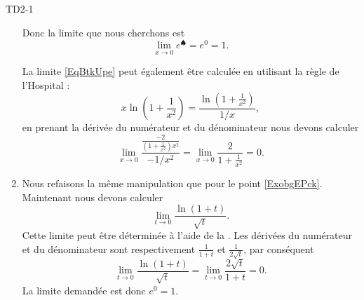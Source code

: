\begin{corrige}{TD2-1}
\begin{enumerate}
			Donc la limite que nous cherchons est
			\begin{equation}
				\lim_{x\to 0} e^{\spadesuit}= e^{0}=1.
			\end{equation}

            La limite \eqref{EqBtkUpe} peut également être calculée en utilisant la règle de l'Hospital :
            \begin{equation}
                x\ln\left( 1+\frac{1}{ x^2 } \right)=\frac{ \ln\left( 1+\frac{1}{ x^2 } \right) }{ 1/x },
            \end{equation}
            en prenant la dérivée du numérateur et du dénominateur nous devons calculer
            \begin{equation}
                \lim_{x\to 0} \frac{ \frac{ -2 }{ \left( 1+\frac{1}{ x^2 } \right)x^2 } }{ -1/x^2 }=\lim_{x\to 0} \frac{ 2 }{ 1+\frac{1}{ x^2 } }=0.
            \end{equation}

        \item
            Nous refaisons la même manipulation que pour le point \ref{ExobgEPck}. Maintenant nous devons calculer
            \begin{equation}
                \lim_{t\to 0} \frac{ \ln(1+t) }{ \sqrt{t} }.
            \end{equation}
            Cette limite peut être déterminée à l'aide de la . Les dérivées du numérateur et du dénominateur sont respectivement \( \frac{1}{ 1+t }\) et \( \frac{1}{ 2\sqrt{t} }\), par conséquent
            \begin{equation}
                \lim_{t\to 0} \frac{ \ln(1+t) }{ \sqrt{t} }=\lim_{t\to 0} \frac{ 2\sqrt{t} }{ 1+t }=0.
            \end{equation}
            La limite demandée est donc \(  e^{0}=1\).
			
	\end{enumerate}

\end{corrige}
